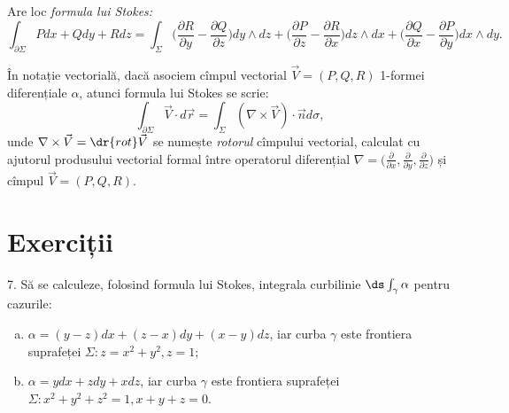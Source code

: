 Are loc \emph{formula lui Stokes:}
\[
  \int_{\partial \Sigma} Pdx + Qdy + Rdz = %
  \int_\Sigma \Big( \frac{\partial R}{\partial y} - %
  \frac{\partial Q}{\partial z} \Big) dy \wedge dz + %
  \Big( \frac{\partial P}{\partial z} - %
  \frac{\partial R}{\partial x} \Big) dz \wedge dx + %
  \Big( \frac{\partial Q}{\partial x} - %
  \frac{\partial P}{\partial y}\Big) dx \wedge dy.
\]

În notație vectorială, dacă asociem cîmpul vectorial $ \vec{V} = (P, Q, R) $
1-formei diferențiale $ \alpha $, atunci formula lui Stokes se scrie:
\[
  \int_{\partial \Sigma} \vec{V} \cdot d\vec{r} = %
  \int_\Sigma (\nabla \times \vec{V}) \cdot \vec{n} d \sigma,
\]
unde $ \nabla \times \vec{V} = \dr{rot} \vec{V} $ se numește \emph{rotorul}
cîmpului vectorial, calculat cu ajutorul produsului vectorial formal între
operatorul diferențial $ \nabla = \Big( \frac{\partial}{\partial x}, %
\frac{\partial}{\partial y}, \frac{\partial}{\partial z} \Big) $ și
cîmpul $ \vec{V} = (P, Q, R) $.



\section{Exerciții}

7. Să se calculeze, folosind formula lui Stokes, integrala curbilinie
$ \ds\int_\gamma \alpha $ pentru cazurile:
\begin{enumerate}[(a)]
\item $ \alpha = (y - z) dx + (z - x) dy + (x - y) dz $, iar curba $ \gamma $
  este frontiera suprafeței $ \Sigma : z = x^2 + y^2, z = 1 $;
\item $ \alpha = y dx + zdy + xdz $, iar curba $ \gamma $ este frontiera
  suprafeței $ \Sigma: x^2 + y^2 + z^2 = 1, x + y + z = 0 $.
\end{enumerate}

